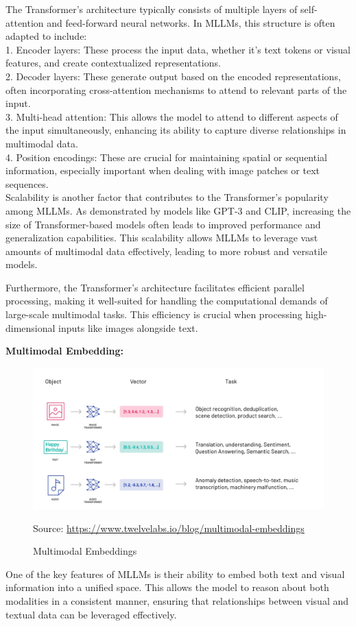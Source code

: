 The Transformer's architecture typically consists of multiple layers of self-attention and feed-forward neural networks. In MLLMs, this structure is often adapted to include:
\\
1. Encoder layers: These process the input data, whether it's text tokens or visual features, and create contextualized representations.
\\
2. Decoder layers: These generate output based on the encoded representations, often incorporating cross-attention mechanisms to attend to relevant parts of the input.
\\
3. Multi-head attention: This allows the model to attend to different aspects of the input simultaneously, enhancing its ability to capture diverse relationships in multimodal data.
\\
4. Position encodings: These are crucial for maintaining spatial or sequential information, especially important when dealing with image patches or text sequences.
\\
Scalability is another factor that contributes to the Transformer's popularity among MLLMs. As demonstrated by models like GPT-3 and CLIP, increasing the size of Transformer-based models often leads to improved performance and generalization capabilities. This scalability allows MLLMs to leverage vast amounts of multimodal data effectively, leading to more robust and versatile models.

Furthermore, the Transformer's architecture facilitates efficient parallel processing, making it well-suited for handling the computational demands of large-scale multimodal tasks. This efficiency is crucial when processing high-dimensional inputs like images alongside text.


\textbf{Multimodal Embedding:} 
\begin{figure}
    \centering
    \includegraphics[width=1.0\linewidth]{chapter2/multimodal_embeddings.png}
    \caption{Multimodal Embeddings}
    Source: \url{https://www.twelvelabs.io/blog/multimodal-embeddings}
    \label{fig:multimodal_embeddings}
\end{figure}
One of the key features of MLLMs is their ability to embed both text and visual information into a unified space. This allows the model to reason about both modalities in a consistent manner, ensuring that relationships between visual and textual data can be leveraged effectively.

